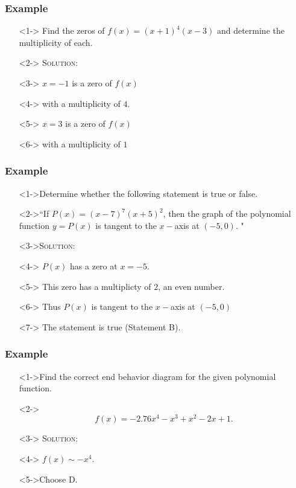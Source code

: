 \documentclass{beamer}
\begin{document}
\begin{frame}
  \frametitle{Example}
    \begin{enumerate}
      \item[]<1-> Find the zeros of $f(x)=(x+1)^{4}(x-3)$ and determine the multiplicity of each.
      \item[]<2-> \textsc{Solution:}
      \item[]<3-> $x=-1$ is a zero of $f(x)$
      \item[]<4-> with a multiplicity of $4$.
      \item[]<5-> $x=3$ is a zero of $f(x)$
      \item[]<6-> with a multiplicity of $1$
    \end{enumerate}
\end{frame}

\begin{frame}
  \frametitle{Example}
  \begin{enumerate}
    \item[]<1->Determine whether the following statement is true or false.
    \item[]<2->``If $P(x)=(x-7)^{7}(x+5)^{2}$, then the graph of the polynomial function $y=P(x)$ is tangent to the $x-$axis at $(-5,0)$. "
    \item[]<3->\textsc{Solution:}
    \item[]<4-> $P(x)$ has a zero at $x=-5$.
    \item[]<5-> This zero has a multiplicty of $2$, an even number.
    \item[]<6-> Thus $P(x)$ is tangent to the $x-$axis at $(-5,0)$
    \item[]<7-> The statement is true (Statement B).
  \end{enumerate}
\end{frame}

\begin{frame}
  \frametitle{Example}
  \begin{enumerate}
    \item[]<1->Find the correct end behavior diagram for the given polynomial function.
    \item[]<2-> \[ f(x)=-2.76x^{4}-x^{3}+x^{2}-2x+1. \]
    \item[]<3-> \textsc{Solution:}
    \item[]<4-> $f(x) \sim -x^{4}$.
    \item[]<5->Choose D.
  \end{enumerate}
\end{frame}
\end{document}

